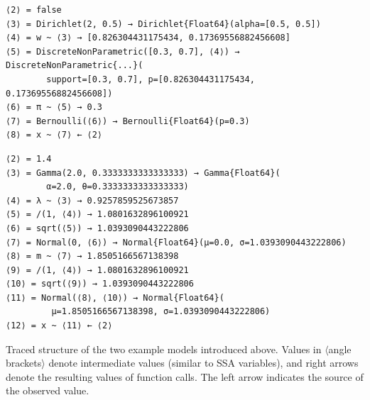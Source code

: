 \newsavebox{\bernoullitrace}
\begin{lrbox}{\bernoullitrace}
\begin{lstlisting}[style=lstfloat]
⟨2⟩ = false
⟨3⟩ = Dirichlet(2, 0.5) → Dirichlet{Float64}(alpha=[0.5, 0.5])
⟨4⟩ = w ~ ⟨3⟩ → [0.826304431175434, 0.17369556882456608]
⟨5⟩ = DiscreteNonParametric([0.3, 0.7], ⟨4⟩) → DiscreteNonParametric{...}(
        support=[0.3, 0.7], p=[0.826304431175434, 0.17369556882456608])
⟨6⟩ = π ~ ⟨5⟩ → 0.3
⟨7⟩ = Bernoulli(⟨6⟩) → Bernoulli{Float64}(p=0.3)
⟨8⟩ = x ~ ⟨7⟩ ← ⟨2⟩
\end{lstlisting}
\end{lrbox}
\newsavebox{\gaussiantrace}
\begin{lrbox}{\gaussiantrace}
\begin{lstlisting}[style=lstfloat]
⟨2⟩ = 1.4
⟨3⟩ = Gamma(2.0, 0.3333333333333333) → Gamma{Float64}(
        α=2.0, θ=0.3333333333333333)
⟨4⟩ = λ ~ ⟨3⟩ → 0.9257859525673857
⟨5⟩ = /(1, ⟨4⟩) → 1.0801632896100921
⟨6⟩ = sqrt(⟨5⟩) → 1.0393090443222806
⟨7⟩ = Normal(0, ⟨6⟩) → Normal{Float64}(μ=0.0, σ=1.0393090443222806)
⟨8⟩ = m ~ ⟨7⟩ → 1.8505166567138398
⟨9⟩ = /(1, ⟨4⟩) → 1.0801632896100921
⟨10⟩ = sqrt(⟨9⟩) → 1.0393090443222806
⟨11⟩ = Normal(⟨8⟩, ⟨10⟩) → Normal{Float64}(
         μ=1.8505166567138398, σ=1.0393090443222806)
⟨12⟩ = x ~ ⟨11⟩ ← ⟨2⟩
\end{lstlisting}
\end{lrbox}
\begin{lstfloat}[p]
  \loosesubcaptions
  \caption{Traced structure of the two example models introduced above.  Values in \(\langle\)angle
    brackets\(\rangle\) denote intermediate values (similar to SSA variables), and right arrows
    denote the resulting values of function calls.  The left arrow indicates the source of the
    observed value.}
  \label{lst:trace-examples}
\end{lstfloat}

\FloatBlock

